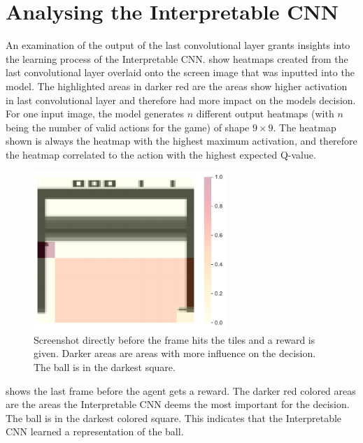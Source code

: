 \section{Analysing the Interpretable CNN}

An examination of the output of the last convolutional layer grants insights into the learning process of the Interpretable CNN.  show heatmaps created from the last convolutional layer overlaid onto the screen image that was inputted into the model. The highlighted areas in darker red are the areas show higher activation in last convolutional layer and therefore had more impact on the models decision. For one input image, the model generates $n$ different output heatmaps (with $n$ being the number of valid actions for the game) of shape $9 \times 9$. The heatmap shown is always the heatmap with the highest maximum activation, and therefore the heatmap correlated to the action with the highest expected Q-value.

\begin{figure}[ht!]
    \centering
    \includegraphics[width=0.65\textwidth]{plots/heatmaps/breakout_heatmap_before_reward.pdf}
    \caption{Screenshot directly before the frame hits the tiles and a reward is given. Darker areas are areas with more influence on the decision. The ball is in the darkest square.}
    \label{fig:heatmap_before_reward}
\end{figure}

 shows the last frame before the agent gets a reward. The darker red colored areas are the areas the Interpretable CNN deems the most important for the decision. The ball is in the darkest colored square. This indicates that the Interpretable CNN learned a representation of the ball.

